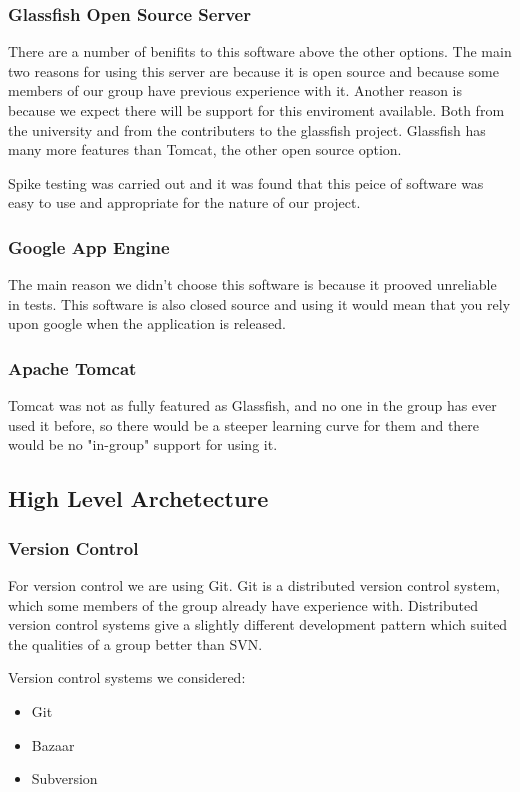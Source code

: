 \documentclass{article}
\begin{document}
\subsubsection{Glassfish Open Source Server}
There are a number of benifits to this software above the other options.
The main two reasons for using this server are because it is open source
and because some members of our group have previous experience with it.
Another reason is because we expect there will be support for this
enviroment available. Both from the university and from the contributers
to the glassfish project. Glassfish has many more features than Tomcat,
the other open source option.

Spike testing was carried out and it was found that this peice of software
was easy to use and appropriate for the nature of our project.

\subsubsection{Google App Engine}
The main reason we didn't choose this software is because it prooved
unreliable in tests. This software is also closed source and using it
would mean that you rely upon google when the application is released.

\subsubsection{Apache Tomcat}
Tomcat was not as fully featured as Glassfish, and no one in the group 
has ever used it before, so there would be a steeper learning curve for
them and there would be no "in-group" support for using it.


\subsection{High Level Archetecture}

\subsubsection{Version Control}
For version control we are using Git. Git is a distributed version control
system, which some members of the group already have experience with.
Distributed version control systems give a slightly different development
pattern which suited the qualities of a group better than SVN.

Version control systems we considered:
\begin{itemize}
	\item{Git}
	\item{Bazaar}
	\item{Subversion}
\end{itemize}
\end{document}
